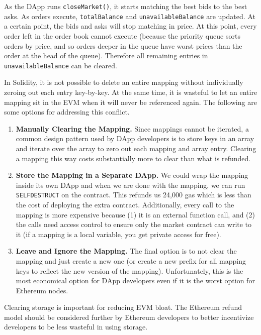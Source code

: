 As the DApp runs \texttt{closeMarket()}, it starts matching the best bids to the best asks. As orders execute, \texttt{totalBalance} and \texttt{unavailableBalance} are updated. At a certain point, the bids and asks will stop matching in price. At this point, every order left in the order book cannot execute (because the priority queue sorts orders by price, and so orders deeper in the queue have worst prices than the order at the head of the queue). Therefore all remaining entries in \texttt{unavailableBalance} can be cleared.

In Solidity, it is not possible to delete an entire mapping without individually zeroing out each entry key-by-key. At the same time, it is wasteful to let an entire mapping sit in the EVM when it will never be referenced again. The following are some options for addressing this conflict.

\begin{enumerate}

\item \textbf{Manually Clearing the Mapping.} Since mappings cannot be iterated, a common design pattern used by DApp developers is to store keys in an array and iterate over the array to zero out each mapping and array entry. Clearing a mapping this way costs substantially more to clear than what is refunded.

\item \textbf{Store the Mapping in a Separate DApp.} We could wrap the mapping inside its own DApp and when we are done with the mapping, we can run \texttt{SELFDESTRUCT} on the contract. This refunds us 24,000 gas which is less than the cost of deploying the extra contract. Additionally, every call to the mapping is more expensive because (1) it is an external function call, and (2) the calls need access control to ensure only the market contract can write to it (if a mapping is a local variable, you get private access for free). 

\item \textbf{Leave and Ignore the Mapping.} The final option is to not clear the mapping and just create a new one (or create a new prefix for all mapping keys to reflect the new version of the mapping). Unfortunately, this is the most economical option for DApp developers even if it is the worst option for Ethereum nodes. 

\end{enumerate}

Clearing storage is important for reducing EVM bloat. The Ethereum refund model should be considered further by Ethereum developers to better incentivize developers to be less wasteful in using storage. 

